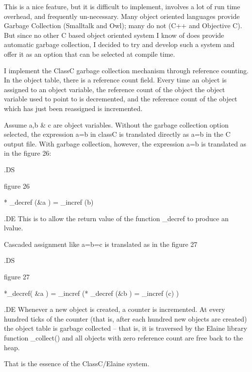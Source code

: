 This is a nice feature, but it is difficult to implement, involves a lot of
run time overhead, and frequently un-necessary.  Many object oriented
languages provide Garbage Collection (Smalltalk and Owl); many do not
(C++ and Objective C).  
But since no other C based object oriented system I know
of does provide automatic garbage collection, I decided
to try and develop such a system and offer it as an option that can be
selected at compile time.  

I implement the ClassC garbage collection mechanism through reference
counting.  In the object table, there is a reference count field.
Every time an object is assigned to an object variable, the reference
count of the object the object variable \fI used \fP to point to is
decremented, and the reference count of the object which has just been
reassigned is incremented.

Assume a,b & c are object variables.  Without the garbage collection option
selected, the expression a=b in classC is translated directly as a=b in the
C output file.  With garbage collection, however, the expression a=b is
translated as in the figure 26:

.DS

figure 26

* _decref (&a ) = _incref (b)


.DE
This is to allow the return value of the function _decref to produce an lvalue.

Cascaded assignment like a=b=c is translated as in the figure 27

.DS

figure 27

*_decref( &a ) = _incref (* _decref (&b ) = _incref (c) )


.DE
Whenever a new object is created, a counter is incremented.  At every
hundred ticks of the counter (that is, after each hundred new objects
are created) the object table is garbage collected -- that is, it is
traversed by the Elaine library function _collect() and all objects with
zero reference count are free back to the heap.


That is the essence of the ClassC/Elaine system.
